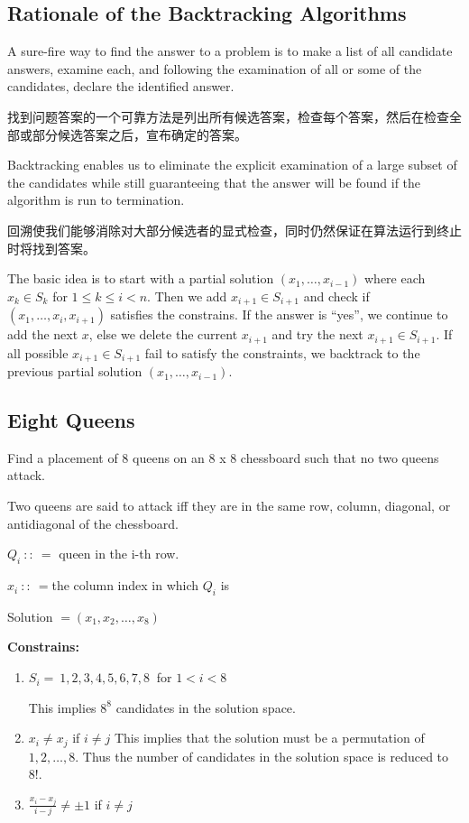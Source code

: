 \documentclass{article}
\begin{document}
\subsection{Rationale of the Backtracking Algorithms}

A sure-fire way to find the answer to a problem is to make a list of all candidate answers, examine each, and following the examination of all or some of the candidates, declare the identified answer.\par
找到问题答案的一个可靠方法是列出所有候选答案，检查每个答案，然后在检查全部或部分候选答案之后，宣布确定的答案。\par
Backtracking enables us to eliminate the explicit examination of a large subset of the candidates while still guaranteeing that the answer will be found if the algorithm is run to termination.\par
回溯使我们能够消除对大部分候选者的显式检查，同时仍然保证在算法运行到终止时将找到答案。\par
The basic idea is to start with a partial solution $( x_1, \dots , x_{i-1} )$ where each $x_k \in S_k$ for  $1 \le k \le i < n$. Then we add  $x_{i+1} \in S_{i+1}$ and check if $( x_1, \dots , x_i, x_{i+1} )$ satisfies the constrains.  If the answer is “yes”, we continue to add the next $x$, else we delete the current $x_{i+1}$ and try the next $x_{i+1} \in S_{i+1}$. If all possible $x_{i+1} \in S_{i+1}$ fail to satisfy the constraints, we backtrack to the previous partial solution $( x_1, \dots , x_{i-1} )$.

\subsection{Eight Queens}
Find a placement of  8 queens on an 8 x 8 chessboard such that no two queens attack.\par
Two queens are said to attack iff they are in the same row, column, diagonal, or antidiagonal of the chessboard.\par
\hspace*{\fill}\par

$Q_i \ :: \ =$ queen in the i-th row. \par
$x_i \ :: \ = $the column index in which $Q_i$ is\par
Solution $= ( x_1, x_2, \dots , x_8 )$\par
\hspace*{\fill}\par
\textbf{Constrains:}\par
\begin{enumerate}
    \item $S_i = \ { 1,2,3,4,5,6,7,8 \ }$ for $ 1 < i < 8$\par
    This implies $8^8$ candidates in the solution space.
    \item $x_i \neq x_j $ if  $i \neq j$
    This implies that the solution must be a permutation of $1, 2, \dots , 8$. Thus the number of candidates in the solution space is reduced to 8!.
    \item $\frac{x_i - x_j}{i - j} \neq \pm 1$ if $i \neq j$
\end{enumerate}
\end{document}
